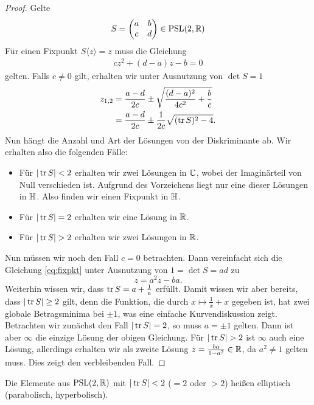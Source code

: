 \begin{proof}
  Gelte
  \[
  S =
  \begin{pmatrix}
    a & b\\
    c & d
  \end{pmatrix} \in \operatorname{PSL}(2, \mathbb{R})
  \]
  Für einen Fixpunkt $S \langle z \rangle = z$ muss die Gleichung
  \begin{align}
    \label{eq:fixpkt}
    c z^2 + (d-a)z - b = 0
  \end{align}
  gelten. Falls $c \neq 0$ gilt, erhalten wir unter Ausnutzung von $\det S = 1$
  \begin{align*}
    z_{1,2} & = \frac{a-d}{2c} \pm \sqrt{\frac{(d-a)^2}{4c^2} +
      \frac{b}{c}} \\
    & = \frac{a-d}{2c} \pm \frac{1}{2c} \sqrt{(\operatorname{tr} S)^2 - 4}.
  \end{align*}
  Nun hängt die Anzahl und Art der Lösungen von der Diskriminante
  ab. Wir erhalten also die folgenden Fälle:
  \begin{itemize}
  \item Für $|\operatorname{tr} S| < 2$ erhalten wir zwei Lösungen in $\mathbb{C}$, wobei
    der Imaginärteil von Null verschieden ist. Aufgrund des
    Vorzeichens liegt nur eine dieser Lösungen in $\mathbb{H}$. Also finden
    wir einen Fixpunkt in $\mathbb{H}$.
  \item Für $|\operatorname{tr} S| = 2$ erhalten wir eine Lösung in $\mathbb{R}$.
  \item Für $|\operatorname{tr} S| > 2$ erhalten wir zwei Lösungen in $\mathbb{R}$.
  \end{itemize}
  Nun müssen wir noch den Fall $c = 0$ betrachten. Dann vereinfacht
  sich die Gleichung \eqref{eq:fixpkt} unter Ausnutzung von $1 = \det
  S = ad$ zu
  \[
  z = a^2 z - ba.
  \]
  Weiterhin wissen wir, dass $\operatorname{tr} S = a + \frac{1}{a}$ erfüllt. Damit
  wissen wir aber bereits, dass $|\operatorname{tr} S| \geq 2$ gilt, denn die
  Funktion, die durch $x \mapsto \frac{1}{x} + x$ gegeben ist, hat
  zwei globale Betragsminima bei $\pm 1$, was eine einfache
  Kurvendiskussion zeigt. Betrachten wir zunächst den Fall $|\operatorname{tr} S| =
  2$, so muss $a = \pm 1$ gelten. Dann ist aber $\infty$ die einzige
  Lösung der obigen Gleichung. Für $|\operatorname{tr} S| > 2$ ist $\infty$ auch
  eine Lösung, allerdings erhalten wir als zweite Lösung $z =
  \frac{ba}{1-a^2} \in \mathbb{R}$, da $a^2 \neq 1$ gelten muss. Dies zeigt
  den verbleibenden Fall.
\end{proof}

\begin{defin}
  Die Elemente aus $\operatorname{PSL}(2,\mathbb{R})$ mit $|\operatorname{tr} S| < 2$ ($ = 2$ oder $ > 2$)
  heißen elliptisch (parabolisch, hyperbolisch).
\end{defin}

